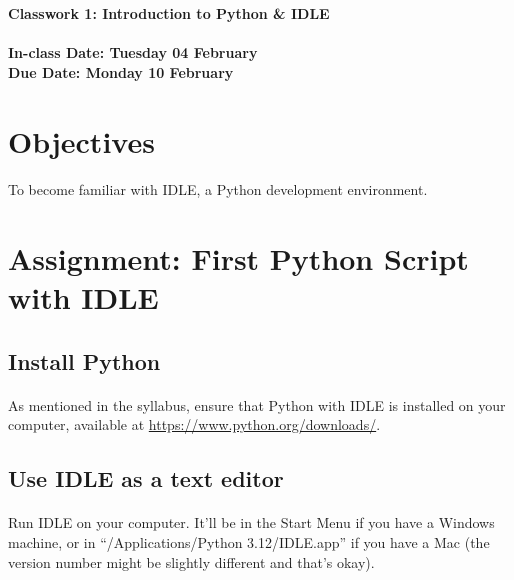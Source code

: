 \documentclass[letter,10pt]{article}
\begin{document}
    \huge
    \textbf{Classwork 1: Introduction to Python \& IDLE}
    \normalsize
    \\ ~~ \\
    \textbf{In-class Date: Tuesday 04 February} \\
    \textbf{Due Date: Monday 10 February}
    
    \section*{Objectives}
    \paragraph{}To become familiar with IDLE, a Python development environment.
    
    \section*{Assignment: First Python Script with IDLE}
    \subsection{Install Python}
    \paragraph{}As mentioned in the syllabus, ensure that Python with IDLE is installed on your computer, available at \url{https://www.python.org/downloads/}.
    
    \subsection{Use IDLE as a text editor}
    \paragraph{}Run IDLE on your computer. It'll be in the Start Menu if you have a Windows machine, or in ``/Applications/Python 3.12/IDLE.app'' if you have a Mac (the version number might be slightly different and that's okay).
    
\end{document}
